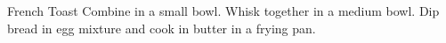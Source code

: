 \begin{recipe}{French Toast}{}{}
Combine in a small bowl.
Whisk together in a medium bowl.
Dip bread in egg mixture and cook in butter in a frying pan.
\end{recipe}
